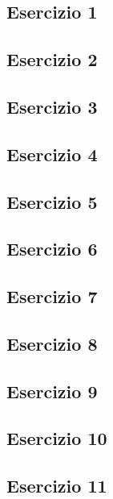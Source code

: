 \vspace{0.8cm}
\subsection{\textbf{Esercizio 1}}

\newpage
\subsection{\textbf{Esercizio 2}}

\newpage
\subsection{\textbf{Esercizio 3}}

\newpage
\subsection{\textbf{Esercizio 4}}

\newpage
\subsection{\textbf{Esercizio 5}}

\newpage
\subsection{\textbf{Esercizio 6}}

\newpage
\subsection{\textbf{Esercizio 7}}

\newpage
\subsection{\textbf{Esercizio 8}}

\newpage
\subsection{\textbf{Esercizio 9}}

\newpage
\subsection{\textbf{Esercizio 10}}

\newpage
\subsection{\textbf{Esercizio 11}}

